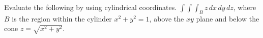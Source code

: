Evaluate the following by using cylindrical coordinates.
\( \int \int \int_B z \, dx \, dy \, dz \), where \( B \) is the region within the cylinder \( x^2 + y^2 = 1 \), above the \( xy \) plane and below the cone \( z = \sqrt{x^2 + y^2} \).
